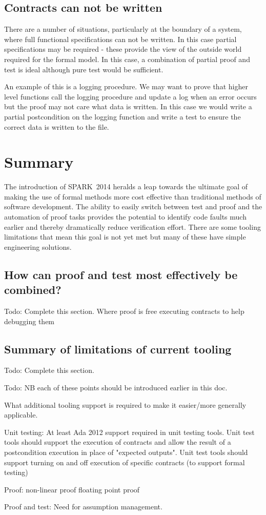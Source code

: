 \documentclass{llncs}
\newcommand{\newspark}{SPARK~2014\xspace}
\begin{document}
\subsection{Contracts can not be written}

There are a number of situations, particularly at the boundary of a
system, where full functional specifications can not be written. In
this case partial specifications may be required - these provide the
view of the outside world required for the formal model. In this case,
a combination of partial proof and test is ideal although pure test
would be sufficient.

An example of this is a logging procedure. We may want to prove that higher 
level functions call the logging procedure and update a log when an
error occurs but the proof may not care what data is written. In this case
we would write a partial postcondition on the logging function and write
a test to ensure the correct data is written to the file.

\section{Summary}

The introduction of \newspark heralds a leap towards the ultimate goal
of making the use of formal methods more cost effective than
traditional methods of software development. The ability to easily
switch between test and proof and the automation of proof tasks
provides the potential to identify code faults much earlier and
thereby dramatically reduce verification effort. There are some
tooling limitations that mean this goal is not yet met but many of
these have simple engineering solutions.

\subsection{How can proof and test most effectively be combined?}
Todo: Complete this section. Where proof is free executing contracts
to help debugging them

\subsection{Summary of limitations of current tooling}

Todo: Complete this section.

Todo: NB each of these points should be introduced earlier in this
doc.

What additional tooling support is required to make it easier/more
generally applicable.

Unit testing: At least Ada 2012 support required in unit testing
tools. Unit test tools should support the execution of contracts and
allow the result of a postcondition execution in place of "expected
outputs". Unit test tools should support turning on and off execution
of specific contracts (to support formal testing)

Proof: non-linear proof floating point proof

Proof and test: Need for assumption management.



\end{document}

